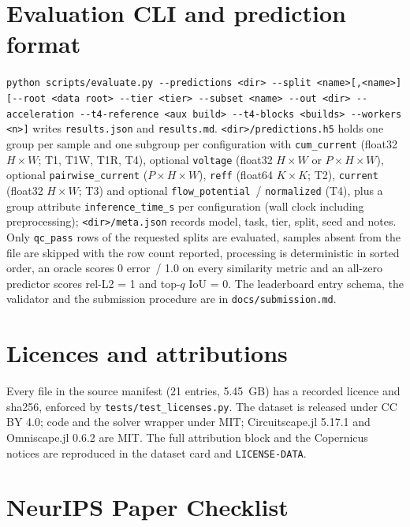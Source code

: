 \documentclass{article}
\newcommand{\relltwo}{rel-L2}
\newcommand{\code}[1]{\texttt{#1}}
\begin{document}
\FloatBarrier
\section{Evaluation CLI and prediction format}
\label{app:format}

\code{python scripts/evaluate.py -{}-predictions <dir> -{}-split <name>[,<name>] [-{}-root <data root> -{}-tier <tier> -{}-subset <name> -{}-out <dir> -{}-acceleration -{}-t4-reference <aux build> -{}-t4-blocks <builds> -{}-workers <n>]} writes \code{results.json} and \code{results.md}. \code{<dir>/predictions.h5} holds one group per sample and one subgroup per configuration with \code{cum\_current} (float32 $H\times W$; T1, T1W, T1R, T4), optional \code{voltage} (float32 $H\times W$ or $P\times H\times W$), optional \code{pairwise\_current} ($P\times H\times W$), \code{reff} (float64 $K\times K$; T2), \code{current} (float32 $H\times W$; T3) and optional \code{flow\_potential}~/ \code{normalized} (T4), plus a group attribute \code{inference\_time\_s} per configuration (wall clock including preprocessing); \code{<dir>/meta.json} records model, task, tier, split, seed and notes. Only \code{qc\_pass} rows of the requested splits are evaluated, samples absent from the file are skipped with the row count reported, processing is deterministic in sorted order, an oracle scores 0 error~/ 1.0 on every similarity metric and an all-zero predictor scores \relltwo{} = 1 and top-$q$ IoU = 0. The leaderboard entry schema, the validator and the submission procedure are in \code{docs/submission.md}.

\FloatBarrier
\section{Licences and attributions}
\label{app:licences}



Every file in the source manifest (21 entries, 5.45~GB) has a recorded licence and sha256, enforced by \code{tests/test\_licenses.py}. The dataset is released under CC BY 4.0; code and the solver wrapper under MIT; Circuitscape.jl 5.17.1 and Omniscape.jl 0.6.2 are MIT. The full attribution block and the Copernicus notices are reproduced in the dataset card and \code{LICENSE-DATA}.

\clearpage
\FloatBarrier
\section*{NeurIPS Paper Checklist}
\end{document}

